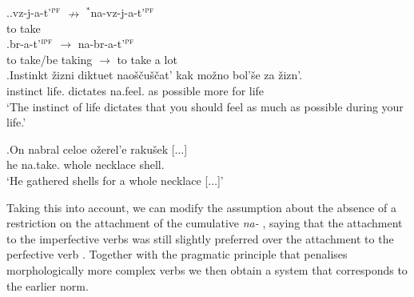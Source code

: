 \ex.\label{chain:nabr}\ag.vz-j-a-t'$^{\textsc{pf}}$ $\nrightarrow$ $^*$na-vz-j-a-t'$^{\textsc{pf}}$\label{chain:navzjat}\\
{to take} {} {}\\
\bg.\label{chain:nabrat}br-a-t'$^{\textsc{ipf}}$ $\rightarrow$ na-br-a-t'$^{\textsc{pf}}$\\
{to take/be taking} $\rightarrow$ {to take a lot}\\

\exg.\label{ex:naoschutit}Instinkt \v{z}izni diktuet nao\v{s}\v{c}u\v{s}\v{c}at' kak mo\v{z}no bol'\v{s}e za \v{z}izn'.\\
instinct life. dictates na.feel. as possible more for life\\
\trans `The instinct of life dictates that you should feel as much as possible during your life.'\\

\exg.\label{ex:nabrat}On nabral celoe o\v{z}erel'e raku\v{s}ek [$\ldots$]\\
he na.take. whole necklace shell.\\
\trans `He gathered shells for a whole necklace [$\ldots$]'\\

Taking this into account, we can modify the assumption about the absence of a restriction on the attachment of the cumulative  \textit{na-}  , saying that the attachment to the imperfective verbs  was still slightly preferred over the attachment to the perfective verb . Together with the pragmatic principle that penalises morphologically more complex verbs  we then obtain a system that corresponds to the earlier norm. 

